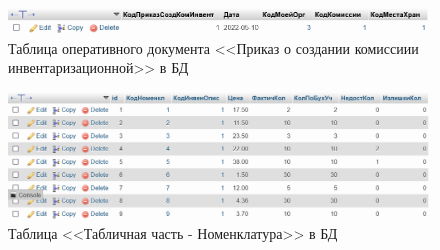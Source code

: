 \documentclass[12pt, a4paper, simple]{eskdtext}
\begin{document}
    \begin{figure}[!h]
        \centering
        \includegraphics[width=12cm]
            {_assets/ОП_ПриказСоздКомИнвент.png}
        \caption{Таблица оперативного документа <<Приказ о создании комиссиии инвентаризационной>> в БД}
        \label{fig:OP_PrikazSozdKomInvent}
    \end{figure}

    \begin{figure}[!h]
        \centering
        \includegraphics[width=18cm]
            {_assets/ТабличнаяЧасть_Номенкл.png}
        \caption{Таблица <<Табличная часть - Номенклатура>> в БД}
        \label{fig:TablichnajaChast_Nomencl}
    \end{figure}
\end{document}
